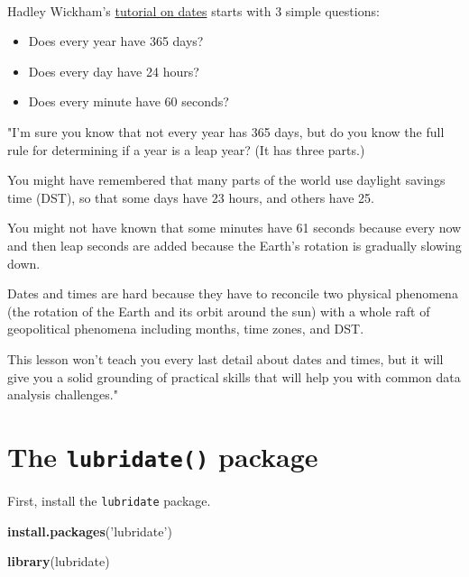 \documentclass[
]{book}
\newenvironment{Shaded}{\begin{snugshade}}{\end{snugshade}}
\newcommand{\KeywordTok}[1]{\textcolor[rgb]{0.13,0.29,0.53}{\textbf{#1}}}
\newcommand{\NormalTok}[1]{#1}
\newcommand{\StringTok}[1]{\textcolor[rgb]{0.31,0.60,0.02}{#1}}
\providecommand{\tightlist}{%
  \setlength{\itemsep}{0pt}\setlength{\parskip}{0pt}}
\begin{document}
~

Hadley Wickham's \href{https://r4ds.had.co.nz/dates-and-times.html}{tutorial on dates} starts with 3 simple questions:

\begin{itemize}
\tightlist
\item
  Does every year have 365 days?
\item
  Does every day have 24 hours?
\item
  Does every minute have 60 seconds?
\end{itemize}

"I'm sure you know that not every year has 365 days, but do you know the full rule for determining if a year is a leap year? (It has three parts.)

You might have remembered that many parts of the world use daylight savings time (DST), so that some days have 23 hours, and others have 25.

You might not have known that some minutes have 61 seconds because every now and then leap seconds are added because the Earth's rotation is gradually slowing down.

Dates and times are hard because they have to reconcile two physical phenomena (the rotation of the Earth and its orbit around the sun) with a whole raft of geopolitical phenomena including months, time zones, and DST.

This lesson won't teach you every last detail about dates and times, but it will give you a solid grounding of practical skills that will help you with common data analysis challenges."

\hypertarget{the-lubridate-package}{%
\section*{\texorpdfstring{The \texttt{lubridate()} package}{The lubridate() package}}\label{the-lubridate-package}}

First, install the \texttt{lubridate} package.

\begin{Shaded}
\begin{Highlighting}[]
\KeywordTok{install.packages}\NormalTok{(}\StringTok{'lubridate'}\NormalTok{)}
\end{Highlighting}
\end{Shaded}

\begin{Shaded}
\begin{Highlighting}[]
\KeywordTok{library}\NormalTok{(lubridate)}
\end{Highlighting}
\end{Shaded}
\end{document}
